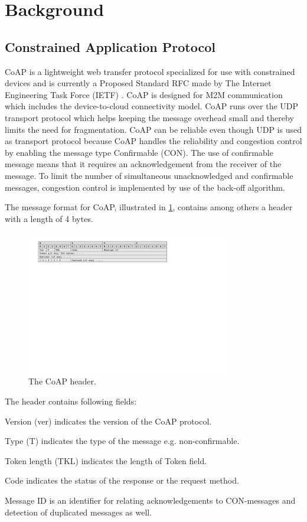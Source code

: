 \section{Background}

\subsection{Constrained Application Protocol}
CoAP is a lightweight web transfer protocol specialized for use with constrained devices and is currently a Proposed Standard RFC made by The Internet Engineering Task Force (IETF) \cite{Inter93:online}. CoAP is designed for M2M communication which includes the device-to-cloud connectivity model.
CoAP runs over the UDP transport protocol which helps keeping the message overhead small and thereby limits the need for fragmentation.
CoAP can be reliable even though UDP is used as transport protocol because CoAP handles the reliability and congestion control by enabling the message type Confirmable (CON). 
The use of confirmable message means that it requires an acknowledgement from the receiver of the message. 
To limit the number of simultaneous unacknowledged and confirmable messages, congestion control is implemented by use of the back-off algorithm.

The message format for CoAP, illustrated in \figurename{\ref{fig:msgformatcoap}}, contains among others a header with a length of 4 bytes. 
\begin{figure}[bht]
	\centering
	\includegraphics[width=3.5in]{gfx/msgformat-coap}
	\caption{The CoAP header.}
	\label{fig:msgformatcoap}
\end{figure}

The header contains following fields: 
\begin{list}{-}{}
	\item Version (ver) indicates the version of the CoAP protocol.
	\item Type (T) indicates the type of the message e.g. non-confirmable.
	\item Token length (TKL) indicates the length of Token field.
	\item Code indicates the status of the response or the request method. 
	\item Message ID is an identifier for relating acknowledgements to CON-messages and detection of duplicated messages as well.
\end{list}


